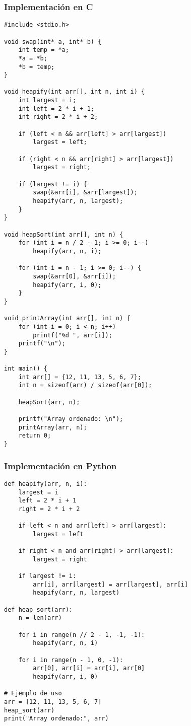\documentclass[11pt,openany]{book}
\begin{document}
\subsubsection{Implementación en C}
\lstset{language=C}
\begin{lstlisting}
#include <stdio.h>

void swap(int* a, int* b) {
    int temp = *a;
    *a = *b;
    *b = temp;
}

void heapify(int arr[], int n, int i) {
    int largest = i;
    int left = 2 * i + 1;
    int right = 2 * i + 2;

    if (left < n && arr[left] > arr[largest])
        largest = left;

    if (right < n && arr[right] > arr[largest])
        largest = right;

    if (largest != i) {
        swap(&arr[i], &arr[largest]);
        heapify(arr, n, largest);
    }
}

void heapSort(int arr[], int n) {
    for (int i = n / 2 - 1; i >= 0; i--)
        heapify(arr, n, i);

    for (int i = n - 1; i >= 0; i--) {
        swap(&arr[0], &arr[i]);
        heapify(arr, i, 0);
    }
}

void printArray(int arr[], int n) {
    for (int i = 0; i < n; i++)
        printf("%d ", arr[i]);
    printf("\n");
}

int main() {
    int arr[] = {12, 11, 13, 5, 6, 7};
    int n = sizeof(arr) / sizeof(arr[0]);

    heapSort(arr, n);

    printf("Array ordenado: \n");
    printArray(arr, n);
    return 0;
}
\end{lstlisting}

\subsubsection{Implementación en Python}
\lstset{language=Python}
\begin{lstlisting}
def heapify(arr, n, i):
    largest = i
    left = 2 * i + 1
    right = 2 * i + 2

    if left < n and arr[left] > arr[largest]:
        largest = left

    if right < n and arr[right] > arr[largest]:
        largest = right

    if largest != i:
        arr[i], arr[largest] = arr[largest], arr[i]
        heapify(arr, n, largest)

def heap_sort(arr):
    n = len(arr)

    for i in range(n // 2 - 1, -1, -1):
        heapify(arr, n, i)

    for i in range(n - 1, 0, -1):
        arr[0], arr[i] = arr[i], arr[0]
        heapify(arr, i, 0)

# Ejemplo de uso
arr = [12, 11, 13, 5, 6, 7]
heap_sort(arr)
print("Array ordenado:", arr)
\end{lstlisting}
\end{document}
